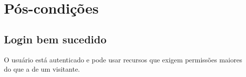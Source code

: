 \documentclass[11pt, a4paper,oneside]{book}
\begin{document}
\section{Pós-condições}

\subsection{Login bem sucedido}

O usuário está autenticado e pode usar recursos que exigem permissões maiores do que a de um visitante.

%
\end{document}
